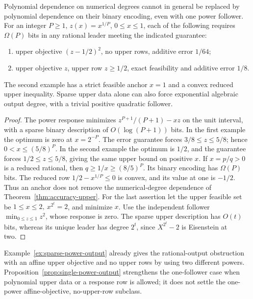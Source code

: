\begin{samepage}
\begin{proposition}
\label{prop:single-power-output}
Polynomial dependence on numerical degrees cannot in general be replaced by
polynomial dependence on their binary encoding, even with one power follower.
For an integer \(P\ge1\), \(z(x)=x^{1/P}\), \(0\le x\le1\), each of the following requires
\(\Omega(P)\) bits in any rational leader meeting the indicated guarantee:
\begin{enumerate}
\item upper objective \((z-1/2)^2\), no upper rows, additive error \(1/64\);
\item upper objective \(z\), upper row \(z\ge1/2\), exact feasibility and
additive error \(1/8\).
\end{enumerate}
The second example has a strict feasible anchor \(x=1\) and a convex reduced
upper inequality. Sparse upper data alone can also force exponential algebraic
output degree, with a trivial positive quadratic follower.
\end{proposition}
\end{samepage}
\begin{proof}
The power response minimizes \(z^{P+1}/(P+1)-xz\) on the unit interval,
with a sparse binary description of \(O(\log(P+1))\) bits.
In the first example the optimum is zero at \(x=2^{-P}\). The error guarantee
forces \(3/8\le z\le5/8\); hence \(0<x\le(5/8)^P\). In the second example
the optimum is \(1/2\), and the guarantee forces \(1/2\le z\le5/8\), giving
the same upper bound on positive \(x\). If \(x=p/q>0\) is a reduced rational,
then \(q\ge1/x\ge(8/5)^P\). Its binary encoding has \(\Omega(P)\) bits.
The reduced row \(1/2-x^{1/P}\le0\) is convex, and its value at one is
\(-1/2\). Thus an anchor does not remove the numerical-degree dependence of
Theorem~\ref{thm:accuracy-upper}.
For the last assertion let the upper feasible set be
\(1\le x\le2,\ x^{2^t}=2\), and minimize \(x\). Use the independent follower
\(\min_{0\le z\le1}z^2\), whose response is zero. The sparse upper description
has \(O(t)\) bits, whereas its unique leader has degree \(2^t\), since
\(X^{2^t}-2\) is Eisenstein at two.
\end{proof}
Example~\ref{ex:sparse-power-output} already gives the rational-output obstruction
with an affine upper objective and no upper rows by using two different powers.
Proposition~\ref{prop:single-power-output} strengthens the one-follower case
when polynomial upper data or a response row is allowed; it does not settle
the one-power affine-objective, no-upper-row subclass.

